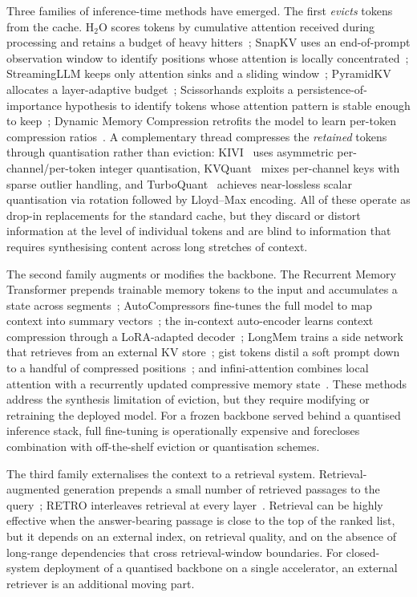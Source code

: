 \documentclass[sn-nature,Numbered]{sn-jnl}
\begin{document}
Three families of inference-time methods have emerged. The first \emph{evicts} tokens from the cache. H${}_2$O scores tokens by cumulative attention received during processing and retains a budget of heavy hitters~\cite{zhang2023h2o}; SnapKV uses an end-of-prompt observation window to identify positions whose attention is locally concentrated~\cite{li2024snapkv}; StreamingLLM keeps only attention sinks and a sliding window~\cite{xiao2024streamingllm}; PyramidKV allocates a layer-adaptive budget~\cite{cai2024pyramidkv}; Scissorhands exploits a persistence-of-importance hypothesis to identify tokens whose attention pattern is stable enough to keep~\cite{liu2024scissorhands}; Dynamic Memory Compression retrofits the model to learn per-token compression ratios~\cite{nawrot2024dmc}. A complementary thread compresses the \emph{retained} tokens through quantisation rather than eviction: KIVI~\cite{liu2024kivi} uses asymmetric per-channel/per-token integer quantisation, KVQuant~\cite{hooper2024kvquant} mixes per-channel keys with sparse outlier handling, and TurboQuant~\cite{zandieh2026turboquant} achieves near-lossless scalar quantisation via rotation followed by Lloyd--Max encoding. All of these operate as drop-in replacements for the standard cache, but they discard or distort information at the level of individual tokens and are blind to information that requires synthesising content across long stretches of context.

The second family augments or modifies the backbone. The Recurrent Memory Transformer prepends trainable memory tokens to the input and accumulates a state across segments~\cite{bulatov2024rmt}; AutoCompressors fine-tunes the full model to map context into summary vectors~\cite{chevalier2023autocompressors}; the in-context auto-encoder learns context compression through a LoRA-adapted decoder~\cite{ge2024icae}; LongMem trains a side network that retrieves from an external KV store~\cite{wang2023longmem}; gist tokens distil a soft prompt down to a handful of compressed positions~\cite{mu2023gisting}; and infini-attention combines local attention with a recurrently updated compressive memory state~\cite{munkhdalai2024infini}. These methods address the synthesis limitation of eviction, but they require modifying or retraining the deployed model. For a frozen backbone served behind a quantised inference stack, full fine-tuning is operationally expensive and forecloses combination with off-the-shelf eviction or quantisation schemes.

The third family externalises the context to a retrieval system. Retrieval-augmented generation prepends a small number of retrieved passages to the query~\cite{lewis2020rag}; RETRO interleaves retrieval at every layer~\cite{borgeaud2022retro}. Retrieval can be highly effective when the answer-bearing passage is close to the top of the ranked list, but it depends on an external index, on retrieval quality, and on the absence of long-range dependencies that cross retrieval-window boundaries. For closed-system deployment of a quantised backbone on a single accelerator, an external retriever is an additional moving part.
\end{document}
